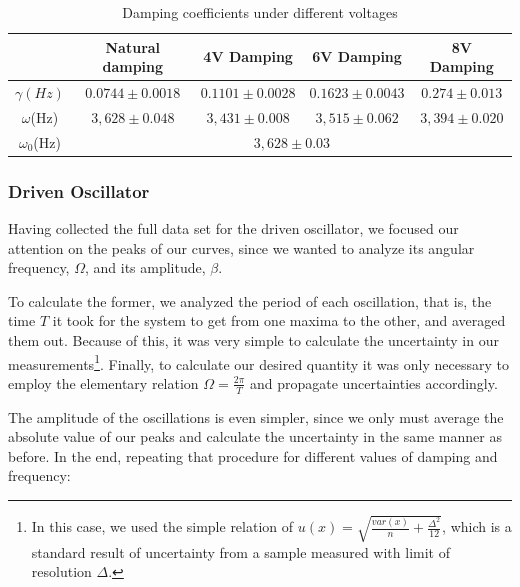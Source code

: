 \documentclass[a4paper,12pt]{article}
\begin{document}
\begin{table}[h!]
    \centering
    \caption{Damping coefficients under different voltages}
    \begin{tabular}{ | c | c | c | c | c | }
    \hline
	& Natural damping & 4V Damping & 6V Damping & 8V Damping  \\
	\hline
	$\gamma (Hz)$ & $0.0744\pm0.0018$ & $0.1101\pm0.0028$ & $0.1623\pm0.0043$ & $0.274\pm0.013$ \\ \hline
	$\omega$(Hz) & $3,628\pm0.048$ & $3,431\pm 0.008$ & $3,515\pm0.062$ & $3,394\pm0.020$ \\ \hline
	\hline
	$\omega_0$(Hz) & \multicolumn{4}{c|}{ $3,628 \pm 0.03$ } \\
	\hline
    \end{tabular}
    
    \label{table:damp}
\end{table}








\subsubsection{Driven Oscillator}\label{driven}

Having collected the full data set for the driven oscillator, we focused our attention on the peaks of our curves, since we wanted to analyze its angular frequency, $\Omega$, and its amplitude, $\beta$. 

To calculate the former, we analyzed the period of each oscillation, that is, the time $T$ it took for the system to get from one maxima to the other, and averaged them out. Because of this, it was very simple to calculate the uncertainty in our measurements\footnote{In this case, we used the simple relation of $u(x) = \sqrt{\frac{var(x)}{n} + \frac{\Delta^2}{12}}$, which is a standard result of uncertainty from a sample measured with limit of resolution $\Delta$.}. Finally, to calculate our desired quantity it was only necessary to employ the elementary relation $\Omega = \frac{2\pi}{T}$ and propagate uncertainties accordingly.

The amplitude of the oscillations is even simpler, since we only must average the absolute value of our peaks and calculate the uncertainty in the same manner as before. In the end, repeating that procedure for different values of damping and frequency:
\end{document}
